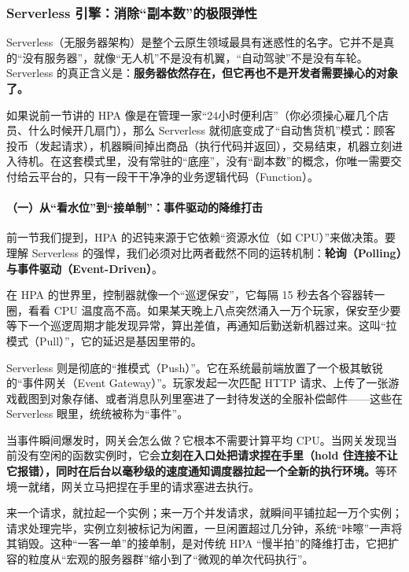 \subsubsection{Serverless 引擎：消除“副本数”的极限弹性}

Serverless（无服务器架构）是整个云原生领域最具有迷惑性的名字。它并不是真的“没有服务器”，就像“无人机”不是没有机翼，“自动驾驶”不是没有车轮。Serverless 的真正含义是：\textbf{服务器依然存在，但它再也不是开发者需要操心的对象了。}

如果说前一节讲的 HPA 像是在管理一家“24小时便利店”（你必须操心雇几个店员、什么时候开几扇门），那么 Serverless 就彻底变成了“自动售货机”模式：顾客投币（发起请求），机器瞬间掉出商品（执行代码并返回），交易结束，机器立刻进入待机。在这套模式里，没有常驻的“底座”，没有“副本数”的概念，你唯一需要交付给云平台的，只有一段干干净净的业务逻辑代码（Function）。

\paragraph{（一）从“看水位”到“接单制”：事件驱动的降维打击}

前一节我们提到，HPA 的迟钝来源于它依赖“资源水位（如 CPU）”来做决策。要理解 Serverless 的强悍，我们必须对比两者截然不同的运转机制：\textbf{轮询（Polling）与事件驱动（Event-Driven）}。

在 HPA 的世界里，控制器就像一个“巡逻保安”，它每隔 15 秒去各个容器转一圈，看看 CPU 温度高不高。如果某天晚上八点突然涌入一万个玩家，保安至少要等下一个巡逻周期才能发现异常，算出差值，再通知后勤送新机器过来。这叫“拉模式（Pull）”，它的延迟是基因里带的。



Serverless 则是彻底的“推模式（Push）”。它在系统最前端放置了一个极其敏锐的“事件网关（Event Gateway）”。玩家发起一次匹配 HTTP 请求、上传了一张游戏截图到对象存储、或者消息队列里塞进了一封待发送的全服补偿邮件——这些在 Serverless 眼里，统统被称为“事件”。

当事件瞬间爆发时，网关会怎么做？它根本不需要计算平均 CPU。当网关发现当前没有空闲的函数实例时，它会\textbf{立刻在入口处把请求捏在手里（hold 住连接不让它报错），同时在后台以毫秒级的速度通知调度器拉起一个全新的执行环境。}等环境一就绪，网关立马把捏在手里的请求塞进去执行。

来一个请求，就拉起一个实例；来一万个并发请求，就瞬间平铺拉起一万个实例；请求处理完毕，实例立刻被标记为闲置，一旦闲置超过几分钟，系统“咔嚓”一声将其销毁。这种“一客一单”的接单制，是对传统 HPA “慢半拍”的降维打击，它把扩容的粒度从“宏观的服务器群”缩小到了“微观的单次代码执行”。

